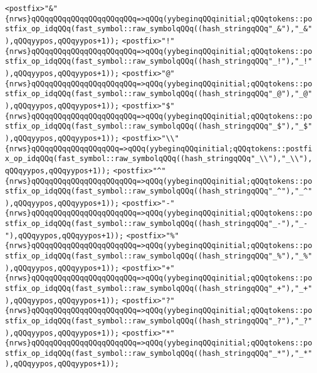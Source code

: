 \verb|<postfix>"&"{nrws}qQQqqQQqqQQqqQQqqQQqqQQq=>qQQq(yybeginqQQqinitial;qQQqtokens::postfix_op_idqQQq(fast_symbol::raw_symbolqQQq((hash_stringqQQq"_&"),"_&"),qQQqyypos,qQQqyypos+1));|\newline
\verb|<postfix>"!"{nrws}qQQqqQQqqQQqqQQqqQQqqQQq=>qQQq(yybeginqQQqinitial;qQQqtokens::postfix_op_idqQQq(fast_symbol::raw_symbolqQQq((hash_stringqQQq"_!"),"_!"),qQQqyypos,qQQqyypos+1));|\newline
\verb|<postfix>"@"{nrws}qQQqqQQqqQQqqQQqqQQqqQQq=>qQQq(yybeginqQQqinitial;qQQqtokens::postfix_op_idqQQq(fast_symbol::raw_symbolqQQq((hash_stringqQQq"_@"),"_@"),qQQqyypos,qQQqyypos+1));|\newline
\verb|<postfix>"$"{nrws}qQQqqQQqqQQqqQQqqQQqqQQq=>qQQq(yybeginqQQqinitial;qQQqtokens::postfix_op_idqQQq(fast_symbol::raw_symbolqQQq((hash_stringqQQq"_$"),"_$"),qQQqyypos,qQQqyypos+1));|\newline
\verb|<postfix>"\\"{nrws}qQQqqQQqqQQqqQQqqQQq=>qQQq(yybeginqQQqinitial;qQQqtokens::postfix_op_idqQQq(fast_symbol::raw_symbolqQQq((hash_stringqQQq"_\\"),"_\\"),qQQqyypos,qQQqyypos+1));|\newline
\verb|<postfix>"^"{nrws}qQQqqQQqqQQqqQQqqQQqqQQq=>qQQq(yybeginqQQqinitial;qQQqtokens::postfix_op_idqQQq(fast_symbol::raw_symbolqQQq((hash_stringqQQq"_^"),"_^"),qQQqyypos,qQQqyypos+1));|\newline
\verb|<postfix>"-"{nrws}qQQqqQQqqQQqqQQqqQQqqQQq=>qQQq(yybeginqQQqinitial;qQQqtokens::postfix_op_idqQQq(fast_symbol::raw_symbolqQQq((hash_stringqQQq"_-"),"_-"),qQQqyypos,qQQqyypos+1));|\newline
\verb|<postfix>"%"{nrws}qQQqqQQqqQQqqQQqqQQqqQQq=>qQQq(yybeginqQQqinitial;qQQqtokens::postfix_op_idqQQq(fast_symbol::raw_symbolqQQq((hash_stringqQQq"_%"),"_%"),qQQqyypos,qQQqyypos+1));|\newline
\verb|<postfix>"+"{nrws}qQQqqQQqqQQqqQQqqQQqqQQq=>qQQq(yybeginqQQqinitial;qQQqtokens::postfix_op_idqQQq(fast_symbol::raw_symbolqQQq((hash_stringqQQq"_+"),"_+"),qQQqyypos,qQQqyypos+1));|\newline
\verb|<postfix>"?"{nrws}qQQqqQQqqQQqqQQqqQQqqQQq=>qQQq(yybeginqQQqinitial;qQQqtokens::postfix_op_idqQQq(fast_symbol::raw_symbolqQQq((hash_stringqQQq"_?"),"_?"),qQQqyypos,qQQqyypos+1));|\newline
\verb|<postfix>"*"{nrws}qQQqqQQqqQQqqQQqqQQqqQQq=>qQQq(yybeginqQQqinitial;qQQqtokens::postfix_op_idqQQq(fast_symbol::raw_symbolqQQq((hash_stringqQQq"_*"),"_*"),qQQqyypos,qQQqyypos+1));|\newline
